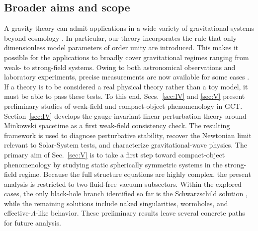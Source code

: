 \documentclass[aps,prd,twocolumn]{revtex4-2}
\begin{document}
\subsection{Broader aims and scope}\label{sec:I.B}
A gravity theory can admit applications in a wide variety of gravitational systems beyond cosmology \cite{Zeldovich1971.book,Misner1973.book}. In particular, our theory incorporates the rule that only dimensionless model parameters of order unity are introduced. This makes it possible for the applications to broadly cover gravitational regimes ranging from weak- to strong-field systems. Owing to both astronomical observations and laboratory experiments, precise measurements are now available for some cases \cite{Will2014.LRR.17.4,deRham2017.RMP.89.025004,Baker2021.RMP.93.015003,Abbott2019.PRL.123.011102}. If a theory is to be considered a real physical theory rather than a toy model, it must be able to pass these tests. To this end, Secs.~\ref{sec:IV} and \ref{sec:V} present preliminary studies of weak-field and compact-object phenomenology in GCT. Section~\ref{sec:IV} develops the gauge-invariant linear perturbation theory around Minkowski spacetime as a first weak-field consistency check. The resulting framework is used to diagnose perturbative stability, recover the Newtonian limit relevant to Solar-System tests, and characterize gravitational-wave physics. The primary aim of Sec.~\ref{sec:V} is to take a first step toward compact-object phenomenology by studying static spherically symmetric systems in the strong-field regime. Because the full structure equations are highly complex, the present analysis is restricted to two fluid-free vacuum subsectors. Within the explored cases, the only black-hole branch identified so far is the Schwarzschild solution \cite{NoHairCaveat}, while the remaining solutions include naked singularities, wormholes, and effective-$\Lambda$-like behavior. These preliminary results leave several concrete paths for future analysis.
\end{document}
